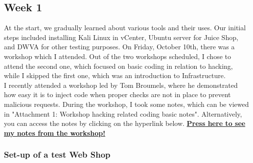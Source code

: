 \documentclass[12pt, letterpaper]{article}
\begin{document}
\subsection{Week 1}
At the start, we gradually learned about various tools and their uses. Our initial steps included installing Kali Linux in vCenter, Ubuntu server for Juice Shop, and DWVA for other testing purposes. On Friday, October 10th, there was a workshop which I attended. Out of the two workshops scheduled, I chose to attend the second one, which focused on basic coding in relation to hacking, while I skipped the first one, which was an introduction to Infrastructure.
\break
\\
I recently attended a workshop led by Tom Broumels, where he demonstrated how easy it is to inject code when proper checks are not in place to prevent malicious requests. During the workshop, I took some notes, which can be viewed in "Attachment 1: Workshop hacking related coding basic notes". Alternatively, you can access the notes by clicking on the hyperlink below.
\hyperref[workshop:week1]{\textbf{Press here to see my notes from the workshop!}}

\newpage
\subsubsection{Set-up of a test Web Shop}
\end{document}
